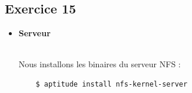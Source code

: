 \documentclass{report}
\begin{document}
\subsection{Exercice 15}
\begin{itemize}
  \item \begin{LARGE}{\textbf{Serveur}} \end{LARGE}
  \vspace{0.3cm}\\
Nous installons les binaires du serveur NFS :
\begin{tcolorbox}
  \begin{verbatim}
    $ aptitude install nfs-kernel-server
  \end{verbatim}
\end{tcolorbox}


\end{itemize}
\end{document}
